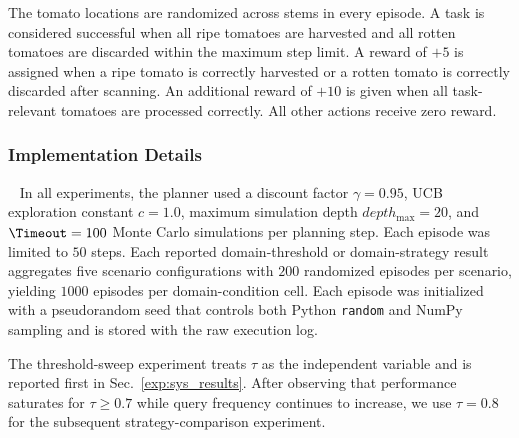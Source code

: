 The tomato locations are randomized across stems in every episode. A task is considered successful when all ripe tomatoes are harvested and all rotten tomatoes are discarded within the maximum step limit. A reward of $+5$ is assigned when a ripe tomato is correctly harvested or a rotten tomato is correctly discarded after scanning. An additional reward of $+10$ is given when all task-relevant tomatoes are processed correctly. All other actions receive zero reward.



\subsubsection{Implementation Details}~\label{exp:details}
In all experiments, the planner used a discount factor $\gamma=0.95$, UCB exploration constant $c=1.0$, maximum simulation depth $depth_{\max}=20$, and $\Timeout=100$ Monte Carlo simulations per planning step. Each episode was limited to $50$ steps. Each reported domain-threshold or domain-strategy result aggregates five scenario configurations with $200$ randomized episodes per scenario, yielding $1000$ episodes per domain-condition cell. Each episode was initialized with a pseudorandom seed that controls both Python \texttt{random} and NumPy sampling and is stored with the raw execution log.

The threshold-sweep experiment treats $\tau$ as the independent variable and is reported first in Sec.~\ref{exp:sys_results}. After observing that performance saturates for $\tau \geq 0.7$ while query frequency continues to increase, we use $\tau=0.8$ for the subsequent strategy-comparison experiment.

